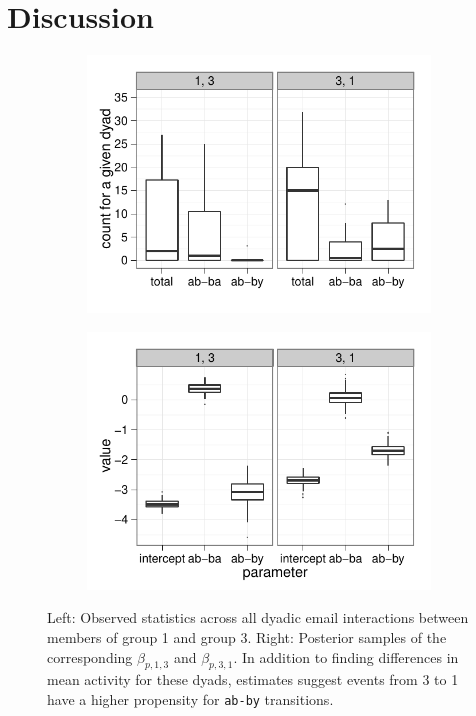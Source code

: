\section{Discussion}


\begin{figure}[t]
\centering
\begin{subfigure}[b]{0.35\textwidth}
\centering
\includegraphics[scale=.5]{../figs/eckmann-small/example-obs-stats}
\end{subfigure}
\qquad
\begin{subfigure}[b]{0.35\textwidth}
\centering
\includegraphics[scale=.5]{../figs/eckmann-small/example-estimates}
\end{subfigure}

\caption{%
 Left: Observed statistics across all dyadic email interactions between  members of group 1 and group 3.  Right: Posterior samples of the corresponding $\beta_{p,1,3}$ and $\beta_{p,3,1}$.  In addition to finding differences in mean activity for these dyads, estimates suggest events from 3 to 1 have a higher propensity for \texttt{ab-by} transitions.}
\label{fig:posteriorparams}
\end{figure}

